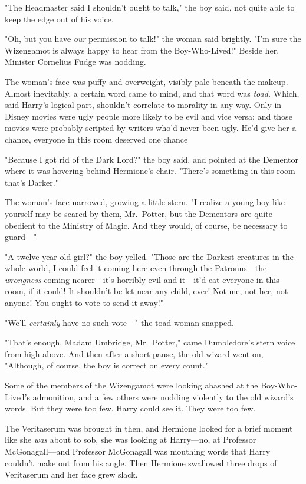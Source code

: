 "The Headmaster said I shouldn't ought to talk," the boy said, not quite able
to keep the edge out of his voice.

"Oh, but you have \emph{our} permission to talk!" the woman said brightly. "I'm
sure the Wizengamot is always happy to hear from the Boy-Who-Lived!" Beside
her, Minister Cornelius Fudge was nodding.

The woman's face was puffy and overweight, visibly pale beneath the makeup.
Almost inevitably, a certain word came to mind, and that word was \emph{toad.}
Which, said Harry's logical part, shouldn't correlate to morality in any way.
Only in Disney movies were ugly people more likely to be evil and vice versa;
and those movies were probably scripted by writers who'd never been ugly. He'd
give her a chance, everyone in this room deserved one chance{\el}

"Because I got rid of the Dark Lord?" the boy said, and pointed at the Dementor
where it was hovering behind Hermione's chair. "There's something in this room
that's Darker."

The woman's face narrowed, growing a little stern. "I realize a young boy like
yourself may be scared by them, Mr.~Potter, but the Dementors are quite
obedient to the Ministry of Magic. And they would, of course, be necessary to
guard—"

"A twelve-year-old girl?" the boy yelled. "Those are the Darkest creatures in
the whole world, I could feel it coming here even through the Patronus—the
\emph{wrongness} coming nearer—it's horribly evil and it—it'd eat everyone
in this room, if it could! It shouldn't be let near any child, ever! Not me,
not her, not anyone! You ought to vote to send it away!"

"We'll \emph{certainly} have no such vote—" the toad-woman snapped.

"That's enough, Madam Umbridge, Mr.~Potter," came Dumbledore's stern voice from
high above. And then after a short pause, the old wizard went on, "Although, of
course, the boy is correct on every count."

Some of the members of the Wizengamot were looking abashed at the
Boy-Who-Lived's admonition, and a few others were nodding violently to the old
wizard's words. But they were too few. Harry could see it. They were too few.

The Veritaserum was brought in then, and Hermione looked for a brief moment
like she \emph{was} about to sob, she was looking at Harry—no, at Professor
McGonagall—and Professor McGonagall was mouthing words that Harry couldn't
make out from his angle. Then Hermione swallowed three drops of Veritaserum and
her face grew slack.

